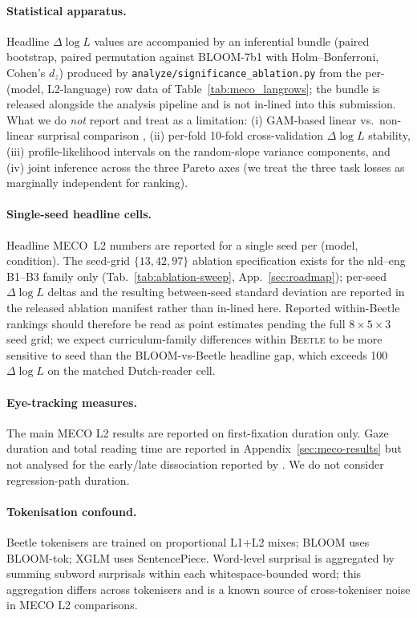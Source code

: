 \documentclass[11pt]{article}
\begin{document}
\paragraph{Statistical apparatus.} Headline $\Delta\log L$ values are accompanied by an inferential bundle (paired bootstrap, paired permutation against BLOOM-7b1 with Holm--Bonferroni, Cohen's $d_z$) produced by \texttt{analyze/significance\_ablation.py} from the per-(model, L2-language) row data of Table~\ref{tab:meco_langrows}; the bundle is released alongside the analysis pipeline and is not in-lined into this submission. What we do \emph{not} report and treat as a limitation: (i) GAM-based linear vs.\ non-linear surprisal comparison \citep{wilcox-etal-2023-language, smith2013effect}, (ii) per-fold 10-fold cross-validation $\Delta\log L$ stability, (iii) profile-likelihood intervals on the random-slope variance components, and (iv) joint inference across the three Pareto axes (we treat the three task losses as marginally independent for ranking).

\paragraph{Single-seed headline cells.} Headline MECO~L2 numbers are reported for a single seed per (model, condition). The seed-grid $\{13, 42, 97\}$ ablation specification exists for the nld--eng B1--B3 family only (Tab.~\ref{tab:ablation-sweep}, App.~\ref{sec:roadmap}); per-seed $\Delta\log L$ deltas and the resulting between-seed standard deviation are reported in the released ablation manifest rather than in-lined here. Reported within-Beetle rankings should therefore be read as point estimates pending the full $8\times 5\times 3$ seed grid; we expect curriculum-family differences within \textsc{Beetle} to be more sensitive to seed than the BLOOM-vs-Beetle headline gap, which exceeds 100 $\Delta\log L$ on the matched Dutch-reader cell.

\paragraph{Eye-tracking measures.} The main MECO L2 results are reported on first-fixation duration only. Gaze duration and total reading time are reported in Appendix~\ref{sec:meco-results} but not analysed for the early/late dissociation reported by \citet{de-varda-marelli-2023-scaling}. We do not consider regression-path duration.

\paragraph{Tokenisation confound.} Beetle tokenisers are trained on proportional L1+L2 mixes; BLOOM uses BLOOM-tok; XGLM uses SentencePiece. Word-level surprisal is aggregated by summing subword surprisals within each whitespace-bounded word; this aggregation differs across tokenisers and is a known source of cross-tokeniser noise in MECO L2 comparisons.
\end{document}

